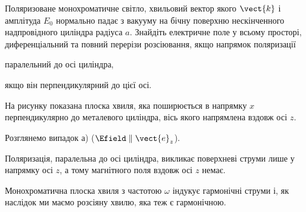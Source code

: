 \begin{problem}\label{prb:Zang_metall_Cyllinder}%
Поляризоване монохроматичне світло, хвильовий вектор якого $\vect{k}$  і амплітуда $E_0$ нормально падає з вакууму на бічну поверхню нескінченного надпровідного циліндра радіуса $a$. Знайдіть електричне поле у всьому просторі, диференціальний та повний перерізи розсіювання, якщо напрямок поляризації
\begin{enumerate*}[label=\alph*)]
\item паралельний до осі циліндра,
\item якщо він перпендикулярний до цієї осі.
\end{enumerate*}
\begin{solution}
	На рисунку показана плоска хвиля, яка поширюється в напрямку $x$ перпендикулярно до металевого циліндра, вісь якого напрямлена вздовж осі $z$.

	\begin{center}
	\end{center}

    Розглянемо випадок а) ($\Efield \parallel \vect{e}_z$).

	Поляризація, паралельна до осі циліндра, викликає поверхневі струми лише у напрямку осі $z$, а тому магнітного поля вздовж осі $z$ немає.
%

	Монохроматична плоска хвиля з частотою $\omega$ індукує  гармонічні струми і, як наслідок ми маємо розсіяну хвилю, яка теж є гармонічною.


\end{solution}
\end{problem}
